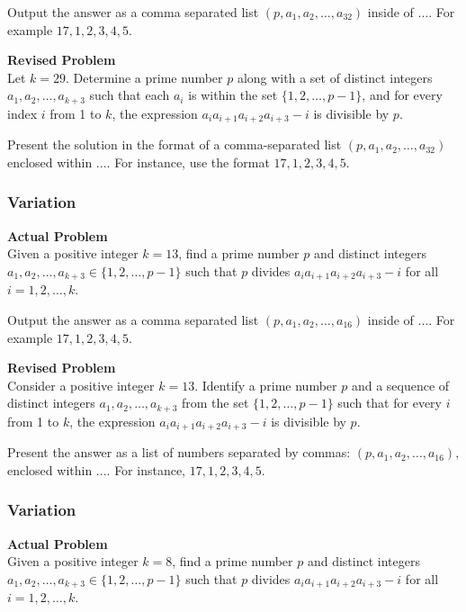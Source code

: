 Output the answer as a comma separated list $(p, a_1, a_2, \ldots, a_32)$ inside of $\boxed{...}$. For example $\boxed{17, 1, 2, 3, 4, 5}$.

\textbf{Revised Problem}\\
Let $k = 29$. Determine a prime number $p$ along with a set of distinct integers $a_1, a_2, \ldots, a_{k+3}$ such that each $a_i$ is within the set $\{1, 2, \ldots, p-1\}$, and for every index $i$ from 1 to $k$, the expression $a_ia_{i+1}a_{i+2}a_{i+3} - i$ is divisible by $p$.

Present the solution in the format of a comma-separated list $(p, a_1, a_2, \ldots, a_{32})$ enclosed within $\boxed{...}$. For instance, use the format $\boxed{17, 1, 2, 3, 4, 5}$.

\subsubsection{Variation}
\textbf{Actual Problem}\\
Given a positive integer $k = 13$, find a prime number $p$ and distinct integers $a_1, a_2, \ldots, a_{k+3} \in \{1, 2, \ldots, p-1\}$ such that $p$ divides $a_ia_{i+1}a_{i+2}a_{i+3}-i$ for all $i = 1, 2, \ldots, k$.

Output the answer as a comma separated list $(p, a_1, a_2, \ldots, a_16)$ inside of $\boxed{...}$. For example $\boxed{17, 1, 2, 3, 4, 5}$.

\textbf{Revised Problem}\\
Consider a positive integer \( k = 13 \). Identify a prime number \( p \) and a sequence of distinct integers \( a_1, a_2, \ldots, a_{k+3} \) from the set \( \{1, 2, \ldots, p-1\} \) such that for every \( i \) from 1 to \( k \), the expression \( a_i a_{i+1} a_{i+2} a_{i+3} - i \) is divisible by \( p \).

Present the answer as a list of numbers separated by commas: \((p, a_1, a_2, \ldots, a_{16})\), enclosed within \(\boxed{...}\). For instance, \(\boxed{17, 1, 2, 3, 4, 5}\).

\subsubsection{Variation}
\textbf{Actual Problem}\\
Given a positive integer $k = 8$, find a prime number $p$ and distinct integers $a_1, a_2, \ldots, a_{k+3} \in \{1, 2, \ldots, p-1\}$ such that $p$ divides $a_ia_{i+1}a_{i+2}a_{i+3}-i$ for all $i = 1, 2, \ldots, k$.

